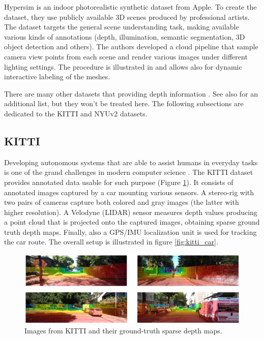 Hypersim \cite{Hypersim} is an indoor photorealistic synthetic dataset from Apple.
To create the dataset, they use publicly available 3D scenes produced by professional artists.
The dataset targets the general scene understanding task, making available various kinds of annotations (depth, illumination, semantic segmentation, 3D object detection and others).
The authors developed a cloud pipeline that sample camera view points from each scene and render various images under different lighting settings.
The procedure is illustrated in \cite{Hypersim} and allows also for dynamic interactive labeling of the meshes.

There are many other datasets that providing depth information \cite{Cityscapes, saxena5, ETH, DIODE, SYNTHIA, DispNet}.
See also \cite{MiDas} for an additional list, but they won't be treated here.
The following subsections are dedicated to the KITTI and NYUv2 datasets.

\subsection{KITTI}
Developing autonomous systems that are able to assist humans in everyday tasks is one of the grand challenges in modern computer science \cite{KITTI}.
The KITTI dataset \cite{KITTI} provides annotated data usable for such purpose (Figure \ref{fig:kitti_example}).
It consists of annotated images captured by a car mounting various sensors.
A stereo-rig with two pairs of cameras capture both colored and gray images (the latter with higher resolution).
A Velodyne (LIDAR) sensor measures depth values producing a point cloud that is projected onto the captured images, obtaining sparse ground truth depth maps.
Finally, also a GPS/IMU localization unit is used for tracking the car route.
The overall setup is illustrated in figure \ref{fig:kitti_car}.

\begin{figure}
	\begin{adjustwidth}{-0.2\textwidth}{-0.2\textwidth}
	\centering
    \includegraphics[width=\textwidth]{figs/kitti_example_2}
	\end{adjustwidth}
    \caption[Examples from the KITTI dataset.]{
        Images from KITTI and their ground-truth sparse depth maps.
        \label{fig:kitti_example}
    }
\end{figure}

